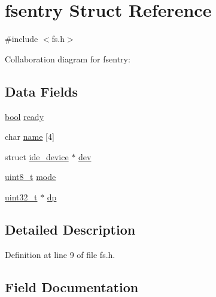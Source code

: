\hypertarget{a00260}{}\section{fsentry Struct Reference}
\label{a00260}


{\ttfamily \#include $<$fs.\+h$>$}



Collaboration diagram for fsentry\+:
\subsection*{Data Fields}
\begin{DoxyCompactItemize}
\item 
\hyperlink{a00134_af6a258d8f3ee5206d682d799316314b1_af6a258d8f3ee5206d682d799316314b1}{bool} \hyperlink{a00260_a284522ed97fe1eeebd0fcc039b2ea00a_a284522ed97fe1eeebd0fcc039b2ea00a}{ready}
\item 
char \hyperlink{a00260_a9c5a4f5b02eb2c9e9e797f79dc99028a_a9c5a4f5b02eb2c9e9e797f79dc99028a}{name} \mbox{[}4\mbox{]}
\item 
struct \hyperlink{a00212}{ide\+\_\+device} $\ast$ \hyperlink{a00260_aaea66ea744fa50f1c54666033884d8d2_aaea66ea744fa50f1c54666033884d8d2}{dev}
\item 
\hyperlink{a00134_aba7bc1797add20fe3efdf37ced1182c5_aba7bc1797add20fe3efdf37ced1182c5}{uint8\+\_\+t} \hyperlink{a00260_a6e71712bc3c51c21dc3362334937e4d7_a6e71712bc3c51c21dc3362334937e4d7}{mode}
\item 
\hyperlink{a00134_a435d1572bf3f880d55459d9805097f62_a435d1572bf3f880d55459d9805097f62}{uint32\+\_\+t} $\ast$ \hyperlink{a00260_ae1d22893563b8753e29fef01f0782ba5_ae1d22893563b8753e29fef01f0782ba5}{dp}
\end{DoxyCompactItemize}


\subsection{Detailed Description}


Definition at line 9 of file fs.\+h.



\subsection{Field Documentation}
\mbox{\label{a00260_aaea66ea744fa50f1c54666033884d8d2_aaea66ea744fa50f1c54666033884d8d2}} 
